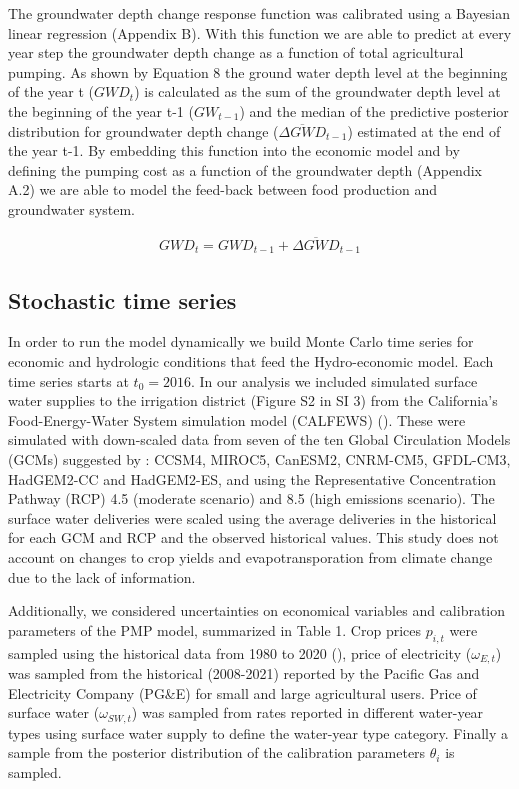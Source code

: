\documentclass[11pt,a4paper]{article}
\begin{document}
The groundwater depth change response function was calibrated using a Bayesian linear regression (Appendix B). With this function we are able to predict at every year step the groundwater depth change as a function of total agricultural pumping. As shown by Equation 8 the ground water depth level at the beginning of the year t ($GWD_{t}$) is calculated as the sum of the groundwater depth level at the beginning of the year t-1 ($GW_{t-1}$) and the median of the predictive posterior distribution for groundwater depth change ($\overline{\Delta GWD}_{t-1}$) estimated at the end of the year t-1. By embedding this function into the economic model and by defining the pumping cost as a function of the groundwater depth (Appendix A.2) we are able to model the feed-back between food production and groundwater system.

\begin{align}
GWD_{t} = GWD_{t-1} + \overline{\Delta GWD}_{t-1}
\end{align}

\subsection{Stochastic time series}

In order to run the model dynamically we build Monte Carlo time series for economic and hydrologic conditions that feed the Hydro-economic model. Each time series starts at $t_{0}=2016$. In our analysis we included simulated surface water supplies to the irrigation district (Figure S2 in SI 3) from the California’s Food-Energy-Water System simulation model (CALFEWS) (\cite{zeff_californias_2021}). These were simulated with down-scaled data from seven of the ten Global Circulation Models (GCMs) suggested by \textcite{pierce_climate_2018}: CCSM4, MIROC5, CanESM2, CNRM-CM5, GFDL-CM3, HadGEM2-CC and HadGEM2-ES, and using the Representative Concentration Pathway (RCP) 4.5 (moderate scenario) and 8.5 (high emissions scenario). The surface water deliveries were scaled using the average deliveries in the historical for each GCM and RCP and the observed historical values. This study does not account on changes to crop yields and evapotransporation from climate change due to the lack of information. 

Additionally, we considered uncertainties on economical variables and calibration parameters of the PMP model, summarized in Table 1. Crop prices $p_{i,t}$ were sampled using the historical data from 1980 to 2020 (\cite{usda_national_2020}), price of electricity ($\omega_{E,t}$) was sampled from the historical (2008-2021) reported by the Pacific Gas and Electricity Company (PG\&E) for small and large agricultural users. Price of surface water ($\omega_{SW,t}$) was sampled from rates reported in different water-year types using surface water supply to define the water-year type category. Finally a sample from the posterior distribution of the calibration parameters $\theta_{i}$ is sampled.
\end{document}
